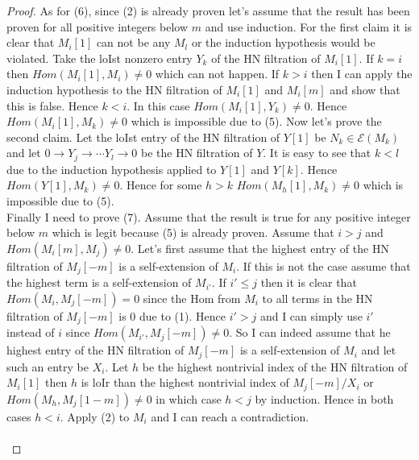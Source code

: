 \begin{proof}
\indent As for (6), since (2) is already proven let's assume that the result has been proven for all positive integers below $m$ and use induction. For the first claim it is clear that $M_i[1]$ can not be any $M_l$ or the induction hypothesis would be violated. Take the loIst nonzero entry $Y_k$ of the HN filtration of $M_i[1]$. If $k=i$ then $Hom(M_i[1],M_i)\neq 0$ which can not happen. If $k>i$ then I can apply the induction hypothesis to the HN filtration of $M_i[1]$ and $M_i[m]$ and show that this is false. Hence $k<i$. In this case $Hom(M_i[1],Y_k)\neq 0$. Hence $Hom(M_i[1],M_k)\neq 0$ which is impossible due to (5). Now let's prove the second claim. Let the loIst entry of the HN filtration of $Y[1]$ be $N_k\in\mathcal{E}(M_k)$ and let $0\to Y_j\to\cdots Y_l\to 0$ be the HN filtration of $Y$. It is easy to see that $k<l$ due to the induction hypothesis applied to $Y[1]$ and $Y[k]$. Hence $Hom(Y[1],M_k)\neq 0$. Hence for some $h>k$ $Hom(M_h[1],M_k)\neq 0$ which is impossible due to (5).\\
\indent Finally I need to prove (7). Assume that the result is true for any positive integer below $m$ which is legit because (5) is already proven. Assume that $i>j$ and $Hom(M_i[m],M_j) \neq 0$. Let's first assume that the highest entry of the HN filtration of $M_j[-m]$ is a self-extension of $M_i$. If this is not the case assume that the highest term is a self-extension of $M_{i'}$. If $i'\leq j$ then it is clear that $Hom(M_i,M_j[-m])=0$ since the Hom from $M_i$ to all terms in the HN filtration of $M_j[-m]$ is 0 due to (1). Hence $i'>j$ and I can simply use $i'$ instead of $i$ since $Hom(M_{i'},M_j[-m])\neq 0$. So I can indeed assume that he highest entry of the HN filtration of $M_j[-m]$ is a self-extension of $M_i$ and let such an entry be $X_i$. Let $h$ be the highest nontrivial index of the HN filtration of $M_i[1]$ then $h$ is loIr than the highest nontrivial index of $M_j[-m]/X_i$ or $Hom(M_h,M_j[1-m])\neq 0$ in which case $h<j$ by induction. Hence in both cases $h<i$. Apply (2) to $M_i$ and I can reach a contradiction.\\\\
\end{proof}
